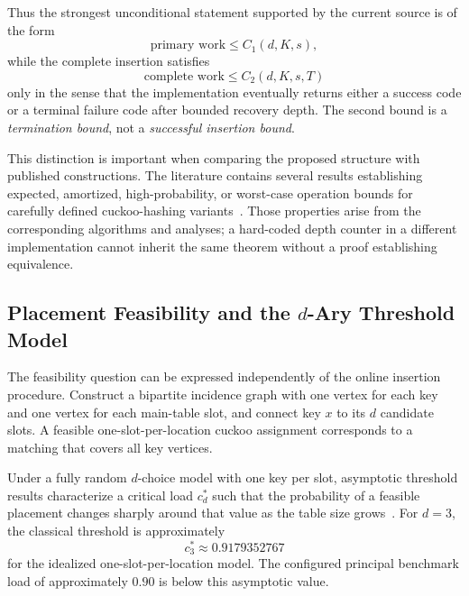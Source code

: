 \documentclass[conference]{IEEEtran}
\begin{document}
Thus the strongest unconditional statement supported by the current source is of the form
\begin{equation}
    \text{primary work}\le C_1(d,K,s),
\end{equation}
while the complete insertion satisfies
\begin{equation}
    \text{complete work}\le C_2(d,K,s,T)
\end{equation}
only in the sense that the implementation eventually returns either a success code or a terminal failure code after bounded recovery depth. The second bound is a \emph{termination bound}, not a \emph{successful insertion bound}.

This distinction is important when comparing the proposed structure with published constructions. The literature contains several results establishing expected, amortized, high-probability, or worst-case operation bounds for carefully defined cuckoo-hashing variants~\cite{arbitman2009deamortized,fountoulakis2010insertion,walzer2022insertion,bell2024constant}. Those properties arise from the corresponding algorithms and analyses; a hard-coded depth counter in a different implementation cannot inherit the same theorem without a proof establishing equivalence.

\subsection{Placement Feasibility and the $d$-Ary Threshold Model}

The feasibility question can be expressed independently of the online insertion procedure. Construct a bipartite incidence graph with one vertex for each key and one vertex for each main-table slot, and connect key $x$ to its $d$ candidate slots. A feasible one-slot-per-location cuckoo assignment corresponds to a matching that covers all key vertices.

Under a fully random $d$-choice model with one key per slot, asymptotic threshold results characterize a critical load $c_d^*$ such that the probability of a feasible placement changes sharply around that value as the table size grows~\cite{fountoulakis2012sharp,dietzfelbinger2009tight}. For $d=3$, the classical threshold is approximately
\begin{equation}
    c_3^*\approx0.9179352767
\end{equation}
for the idealized one-slot-per-location model. The configured principal benchmark load of approximately $0.90$ is below this asymptotic value.
\end{document}

